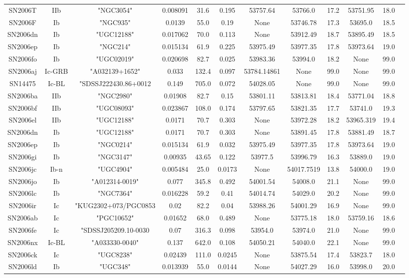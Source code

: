 \documentclass[onecolumn]{aa} %
\begin{document}
\begin{table*}
\begin{tabular}{cccccccccccc}
SN2006T&IIb&"NGC3054"&0.008091&31.6&0.195&53757.64&53766.0&17.2&53751.95&18.0\\ 
SN2006F&Ib&"NGC935"&0.0139&55.0&0.19&None&53746.78&17.3&53695.0&18.5\\ 
SN2006dn&Ib&"UGC12188"&0.017062&70.0&0.113&None&53912.49&18.7&53895.49&18.5\\ 
SN2006ep&Ib&"NGC214"&0.015134&61.9&0.225&53975.49&53977.35&17.8&53973.64&19.0\\ 
SN2006fo&Ib&"UGC02019"&0.020698&82.7&0.025&53983.36&53994.0&18.2&None&99.0\\ 
SN2006aj&Ic-GRB&"A032139+1652"&0.033&132.4&0.097&53784.14861&None&99.0&None&99.0\\ 
SN14475&Ic-BL&"SDSSJ222430.86+0012&0.149&705.0&0.072&54028.05&None&99.0&None&99.0\\ 
SN2006ba&IIb&"NGC2980"&0.01908&82.7&0.15&53801.11&53813.81&18.4&53771.04&18.8\\ 
SN2006bf&IIb&"UGC08093"&0.023867&108.0&0.174&53797.65&53821.35&17.7&53741.0&19.3\\ 
SN2006el&IIb&"UGC12188"&0.0171&70.7&0.303&None&53972.28&18.2&53965.319&19.4\\ 
SN2006dn&Ib&"UGC12188"&0.0171&70.7&0.303&None&53891.45&17.8&53881.49&18.7\\ 
SN2006ep&Ib&"NGC0214"&0.015134&61.9&0.032&53975.49&53977.35&17.8&53973.64&19.0\\ 
SN2006gi&Ib&"NGC3147"&0.00935&43.65&0.122&53977.5&53996.79&16.3&53889.0&19.0\\ 
SN2006jc&Ib-n&"UGC4904"&0.005484&25.0&0.0173&None&54017.7519&13.8&54000.0&19.0\\ 
SN2006jo&Ib&"A012314-0019"&0.077&345.8&0.492&54001.54&54008.0&21.1&None&99.0\\ 
SN2006lc&Ib&"NGC7364"&0.016228&59.2&0.41&54014.74&54029.0&20.2&None&99.0\\ 
SN2006ir&Ic&"KUG2302+073/PGC0853&0.02&82.2&0.04&53988.26&54001.29&16.9&None&99.0\\ 
SN2006ab&Ic&"PGC10652"&0.01652&68.0&0.489&None&53775.18&18.0&53759.16&18.6\\ 
SN2006fe&Ic&"SDSSJ205209.10-0030&0.07&316.3&0.098&53954.0&53974.0&21.0&None&99.0\\ 
SN2006nx&Ic-BL&"A033330-0040"&0.137&642.0&0.108&54050.21&54040.0&22.1&None&99.0\\ 
SN2006ck&Ic&"UGC8238"&0.02439&111.0&0.0245&None&53875.54&17.4&53823.7&18.0\\ 
SN2006ld&Ib&"UGC348"&0.013939&55.0&0.0144&None&54027.29&16.0&53998.0&20.0\\ 

\end{tabular}
\end{table*}
\end{document}
